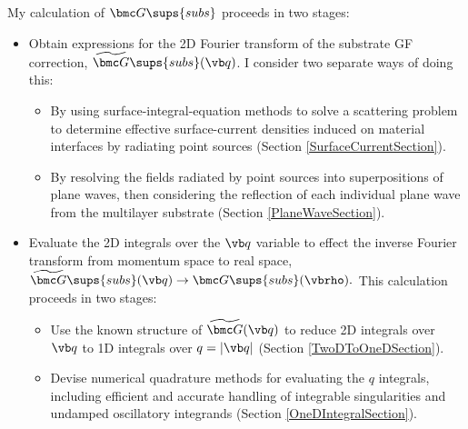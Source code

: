 \documentclass[letterpaper]{article}
\renewcommand{\wt}{\widetilde}
\begin{document}
My calculation of $\bmc G\sups{subs}$ proceeds in two stages:
\begin{itemize}
 \item Obtain expressions for the 2D Fourier transform of the
       substrate GF correction, $\wt{\bmc G}\sups{subs}(\vb q)$.
       I consider two separate ways of doing this:
       \begin{itemize}
         \item By using surface-integral-equation methods to solve
               a scattering problem to determine effective 
               surface-current densities induced on material interfaces
               by radiating point sources (Section \ref{SurfaceCurrentSection}).
         \item By resolving the fields radiated by point sources
               into superpositions of plane waves, then considering the 
               reflection of each individual plane wave from the 
               multilayer substrate (Section \ref{PlaneWaveSection}).
       \end{itemize}
         
 \item Evaluate the 2D integrals over the $\vb q$ variable
       to effect the inverse Fourier transform from momentum space
       to real space,
       $\wt{\bmc G}\sups{subs}(\vb q) \to \bmc G\sups{subs}(\vbrho).$
       This calculation proceeds in two stages:
       \begin{itemize}
         \item Use the known structure of $\wt{\bmc G}(\vb q)$
               to reduce 2D integrals over $\vb q$ to 1D integrals over $q=|\vb q|$
               (Section \ref{TwoDToOneDSection}).
         \item Devise numerical quadrature methods for evaluating the
               $q$ integrals, including efficient and accurate handling
               of integrable singularities and undamped oscillatory integrands
               (Section \ref{OneDIntegralSection}).
       \end{itemize}
\end{itemize}

\newpage
\end{document}
